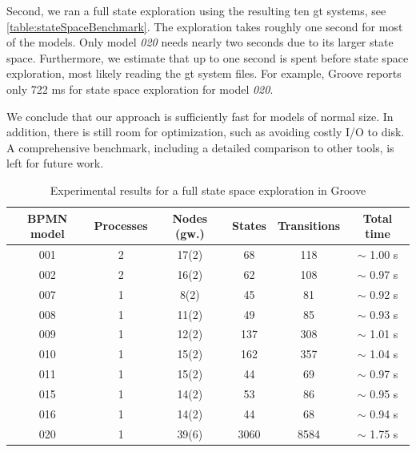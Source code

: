 \documentclass[runningheads]{llncs}
\begin{document}
Second, we ran a full state exploration using the resulting ten \gls*{gt} systems, see \autoref{table:stateSpaceBenchmark}.
The exploration takes roughly one second for most of the models.
Only model \textit{020} needs nearly two seconds due to its larger state space.
Furthermore, we estimate that up to one second is spent before state space exploration, most likely reading the \gls*{gt} system files.
For example, Groove reports only 722 ms for state space exploration for model \textit{020}.

We conclude that our approach is sufficiently fast for models of normal size.
In addition, there is still room for optimization, such as avoiding costly I/O to disk.
A comprehensive benchmark, including a detailed comparison to other tools, is left for future work.

\begin{table}[ht]
\centering

\begin{tabular}{| c | c | c || c | c | c |}
 \hline
 BPMN model & Processes & Nodes (gw.) & States & Transitions & Total time \\
 \hline\hline
 001 & 2 & 17(2) & 68 & 118 & $\sim$ 1.00 s \\
 \hline
 002 & 2 & 16(2) & 62 & 108 & $\sim$ 0.97 s \\
 \hline
 007 & 1 & 8(2) & 45 & 81 & $\sim$ 0.92 s \\
 \hline
 008 & 1 & 11(2) & 49 & 85 & $\sim$ 0.93 s \\
 \hline
 009 & 1 & 12(2) & 137 & 308 & $\sim$ 1.01 s \\
 \hline
 010 & 1 & 15(2) & 162 & 357 & $\sim$ 1.04 s \\
 \hline
 011 & 1 & 15(2) & 44 & 69 & $\sim$ 0.97 s \\
 \hline
 015 & 1 & 14(2) & 53 & 86 & $\sim$ 0.95 s \\
 \hline
 016 & 1 & 14(2) & 44 & 68 & $\sim$ 0.94 s \\
 \hline
 020 & 1 & 39(6) & 3060 & 8584 & $\sim$ 1.75 s \\
 \hline
\end{tabular}
\caption[Experimental results for a full state space exploration in Groove]{Experimental results for a full state space exploration in Groove}
\label{table:stateSpaceBenchmark}
\end{table}
\end{document}

